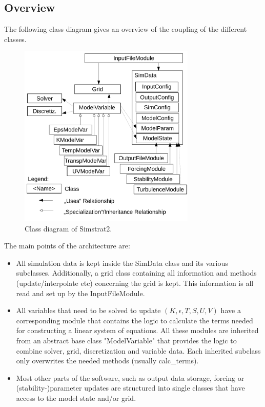 \documentclass[paper=a4, fontsize=12pt]{article}
\begin{document}
\subsection{Overview}
The following class diagram gives an overview of the coupling of the different classes.
\begin{figure}[h]
		\includegraphics[width=0.75\textwidth]{classdiagram.pdf}
		\caption{Class diagram of Simstrat2.}
\end{figure}
The main points of the architecture are:
\begin{itemize}
	\item All simulation data is kept inside the SimData class and its various subclasses. Additionally, a grid class containing all information and methods (update/interpolate etc) concerning the grid is kept. This information is all read and set up by the InputFileModule.
	
	\item All variables that need to be solved to update $(K,\epsilon,T,S,U,V)$ have a corresponding module that contains the logic to calculate the terms needed for constructing a linear system of equations. All these modules are inherited from an abstract base class "ModelVariable" that provides the logic to combine solver, grid, discretization and variable data. Each inherited subclass only overwrites the needed methods (usually calc\_terms).
	
	\item Most other parts of the software, such as output data storage, forcing or (stability-)parameter updates are structured into single classes that have access to the model state and/or grid.
\end{itemize}
\end{document}

